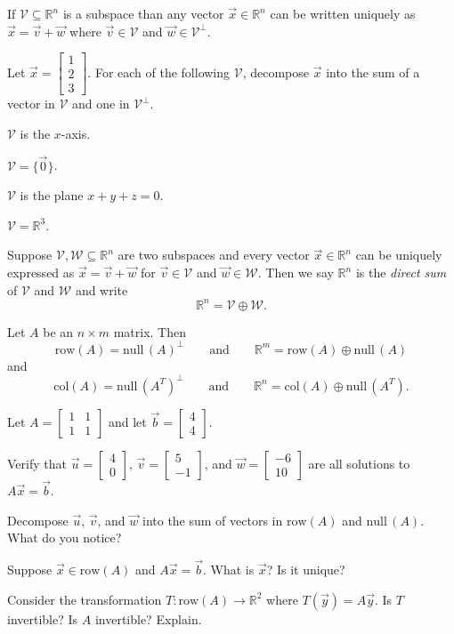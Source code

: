\documentclass[14pt]{problemset}
\newcommand{\R}{\mathbb{R}}
\newcommand{\Null}{\mathrm{null}\,}
\newcommand{\mat}[1]{\begin{bmatrix}#1\end{bmatrix}}
\begin{document}
	\begin{theorem}
		If $\mathcal V\subseteq \R^n$ is a subspace than any vector $\vec x\in\R^n$ can be written uniquely as
		$
			\vec x=\vec v+\vec w
		$
		where $\vec v\in\mathcal V$ and $\vec w\in{\mathcal V}^\perp$.
	\end{theorem}

	\question
	Let $\vec x=\mat{1\\2\\3}$. For each of the following $\mathcal V$, decompose $\vec x$ into the sum of a vector in
	$\mathcal V$ and one in ${\mathcal V}^\perp$.
	\begin{parts}
		\item $\mathcal V$ is the $x$-axis.
		\item $\mathcal V=\{\vec 0\}$.
		\item $\mathcal V$ is the plane $x+y+z=0$.
		\item $\mathcal V=\R^3$.
	\end{parts}


	\begin{definition}
		Suppose $\mathcal V,\mathcal W\subseteq \R^n$ are two subspaces and every vector $\vec x\in\R^n$
		can be uniquely expressed as $\vec x=\vec v+\vec w$ for $\vec v\in\mathcal V$ and $\vec w\in\mathcal W$.
		Then we say $\R^n$ is the \emph{direct sum} of $\mathcal V$ and $\mathcal W$ and write
		\[
			\R^n=\mathcal V\oplus \mathcal W.
		\]
	\end{definition}

	\begin{theorem}
		Let $A$ be an $n\times m$ matrix. Then 
		\[
			\text{row}(A)=\Null(A)^\perp\qquad\text{and}\qquad \R^m = \text{row}(A)\oplus \Null(A)
		\]
		and
		\[
			\text{col}(A)=\Null(A^T)^\perp\qquad\text{and}\qquad \R^n = \text{col}(A)\oplus \Null(A^T).
		\]
	\end{theorem}

	\question
	Let $A=\mat{1&1\\1&1}$ and let $\vec b=\mat{4\\4}$.
	\begin{parts}
		\item Verify that $\vec u=\mat{4\\0}$, $\vec v=\mat{5\\-1}$, and $\vec w=\mat{-6\\10}$ are all solutions
			to $A\vec x=\vec b$.
		\item Decompose $\vec u$, $\vec v$, and $\vec w$ into the sum of vectors in $\text{row}(A)$ and $\Null(A)$. What do you notice?

		\item Suppose $\vec x\in\text{row}(A)$ and $A\vec x=\vec b$. What is $\vec x$? Is it unique?

		\item Consider the transformation $T:\text{row}(A)\to\R^2$ where $T(\vec y)=A\vec y$. Is $T$ invertible? Is $A$ invertible? Explain.

	\end{parts}
\end{document}
